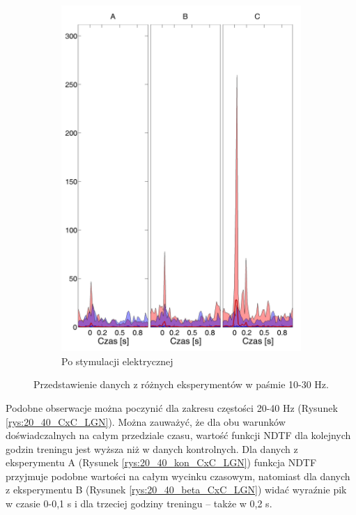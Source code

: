 \documentclass{pracamgr_2}
\begin{document}
\begin{figure}[h]
\begin{subfigure}{.5\textwidth}
			\centering
			\includegraphics[width=1.\linewidth]{beta3_10-30_z_CxC5_do_LGN42.png}
			\caption{Po stymulacji elektrycznej}
			\label{rys:10_30_beta_CxC_LGN}
		\end{subfigure}
		\caption{Przedstawienie danych z różnych eksperymentów w paśmie 10-30 Hz.}
		\label{rys:10_30_CxC_LGN}
	\end{figure}
	\FloatBarrier
	Podobne obserwacje można poczynić dla zakresu częstości 20-40 Hz (Rysunek \ref{rys:20_40_CxC_LGN}). Można zauważyć, że dla obu warunków doświadczalnych na całym przedziale czasu, wartość funkcji NDTF dla kolejnych godzin treningu jest wyższa niż w danych kontrolnych. Dla danych z eksperymentu A (Rysunek \ref{rys:20_40_kon_CxC_LGN}) funkcja NDTF przyjmuje podobne wartości na całym wycinku czasowym, natomiast dla danych z eksperymentu B (Rysunek \ref{rys:20_40_beta_CxC_LGN}) widać wyraźnie pik w czasie 0-0,1 s i dla trzeciej godziny treningu -- także w 0,2 s.
\end{document}
